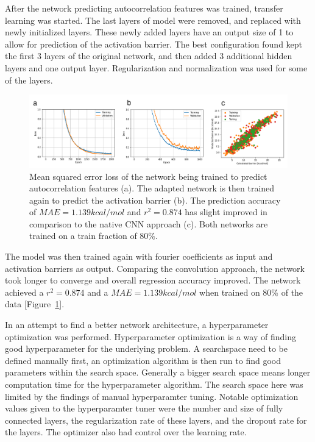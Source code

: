 After the network predicting autocorrelation features was trained, transfer learning was started.
The last layers of model were removed, and replaced with newly initialized layers.
These newly added layers have an output size of 1 to allow for prediction of the activation barrier.
The best configuration found kept the first 3 layers of the original network, and then added 3 additional hidden layers and one output layer.
Regularization and normalization was used for some of the layers.
\begin{figure}[H]
  \includegraphics[width=1.0\textwidth]{figures/regression/fourier/transfer/transfer-loss.png}
  \caption[LEFD transfer learning]{
  Mean squared error loss of the network being trained to predict autocorrelation features (a).
  The adapted network is then trained again to predict the activation barrier (b).
  The prediction accuracy of $MAE=1.139 kcal/mol$ and $r^2=0.874$ has slight improved in comparison to the native CNN approach (c).  
  Both networks are trained on a train fraction of 80\%.
  }
  \label{fig:transfer_final}
\end{figure}
The model was then trained again with fourier coefficients as input and activation barriers as output.
Comparing the convolution approach, the network took longer to converge and overall regression accuracy improved.
The network achieved a $r^2=0.874$ and a $MAE=1.139 kcal/mol$ when trained on 80\% of the data [Figure~\ref{fig:transfer_final}].



In an attempt to find a better network architecture, a hyperparameter optimization was performed.
Hyperparameter optimization is a way of finding good hyperparameter for the underlying problem.
A searchspace need to be defined manually first, an optimization algorithm is then run to find good parameters within the search space.
Generally a bigger search space means longer computation time for the hyperparameter algorithm.
The search space here was limited by the findings of manual hyperparamter tuning.
Notable optimization values given to the hyperparamter tuner were the number and size of fully connected layers, the regularization rate of these layers, and the dropout rate for the layers.
The optimizer also had control over the learning rate.


